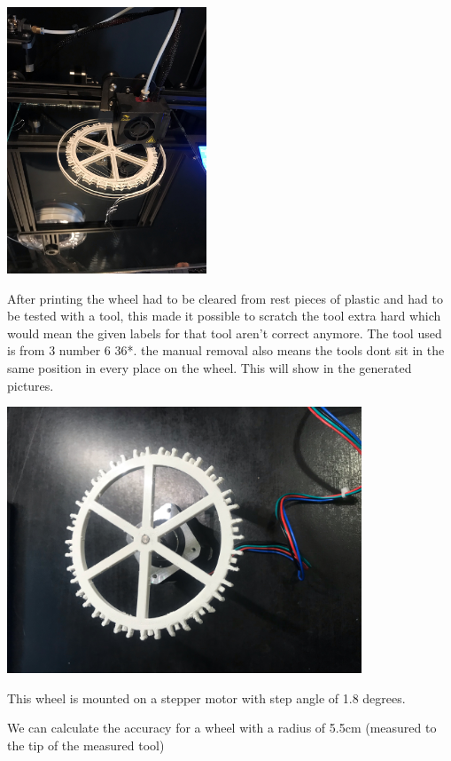 \documentclass{article}
\begin{document}
\includegraphics[height=3.125000in, keepaspectratio=true]{./ZimFiles_files/Camera_setup/Tool_Holder/Wheel_Holder/first_wheel_holder/radhouder_duringprint.jpeg}

After printing the wheel had to be cleared from rest pieces of plastic and had to be tested with a tool, this made it possible to scratch the tool extra hard which would mean the given labels for that tool aren't correct anymore. The tool used is from 3 number 6 36*. the manual removal also means the tools dont sit in the same position in every place on the wheel. This will show in the generated pictures.

\includegraphics[height=3.125000in, keepaspectratio=true]{./ZimFiles_files/Camera_setup/Tool_Holder/Wheel_Holder/first_wheel_holder/radhouder_horizontal.jpeg}



This wheel is mounted on a stepper motor with step angle of 1.8 degrees.

We can calculate the accuracy for a wheel with a radius of 5.5cm (measured to the tip of the measured tool) 
\end{document}
